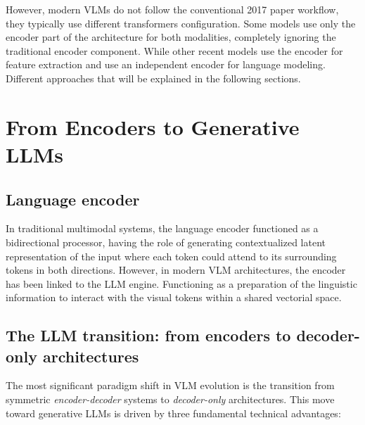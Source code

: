 However, modern VLMs do not follow the conventional 2017 paper \cite{vaswani2023attentionneed} workflow, they typically use different transformers configuration. Some models use only the encoder part of the architecture for both modalities, completely ignoring the traditional encoder component. While other recent models use the encoder for feature extraction and use an independent encoder for language modeling. Different approaches that will be explained in the following sections. 


\section{From Encoders to Generative LLMs}
\subsection{Language encoder} 
In traditional multimodal systems, the language encoder functioned as a bidirectional processor, having the role of generating contextualized latent representation of the input where each token could attend to its surrounding tokens in both directions. However, in modern VLM architectures, the encoder has been linked to the LLM engine. Functioning as a preparation of the linguistic information to interact with the visual tokens within a shared vectorial space.  

\subsection{The LLM transition: from encoders to decoder-only architectures}
The most significant paradigm shift in VLM evolution is the transition from symmetric \textit{encoder-decoder} systems to \textit{decoder-only} architectures. This move toward generative LLMs is driven by three fundamental technical advantages:

